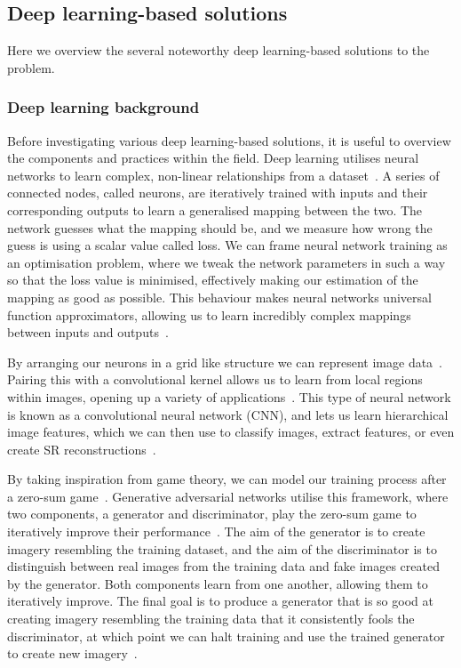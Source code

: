 \subsection{Deep learning-based solutions}
Here we overview the several noteworthy deep learning-based solutions to the problem.

\subsubsection{Deep learning background}
Before investigating various deep learning-based solutions, it is useful to overview the components and practices within the field. Deep learning utilises neural networks to learn complex, non-linear relationships from a dataset~\cite{nn}. A series of connected nodes, called neurons, are iteratively trained with inputs and their corresponding outputs to learn a generalised mapping between the two. The network guesses what the mapping should be, and we measure how wrong the guess is using a scalar value called loss. We can frame neural network training as an optimisation problem, where we tweak the network parameters in such a way so that the loss value is minimised, effectively making our estimation of the mapping as good as possible. This behaviour makes neural networks universal function approximators, allowing us to learn incredibly complex mappings between inputs and outputs~\cite{nn}.

By arranging our neurons in a grid like structure we can represent image data~\cite{imageNet}. Pairing this with a convolutional kernel allows us to learn from local regions within images, opening up a variety of applications~\cite{imageNet}. This type of neural network is known as a convolutional neural network (CNN), and lets us learn hierarchical image features, which we can then use to classify images, extract features, or even create SR reconstructions~\cite{vgg19,imageNet,srcnn}.

By taking inspiration from game theory, we can model our training process after a zero-sum game~\cite{gan}. Generative adversarial networks utilise this framework, where two components, a generator and discriminator, play the zero-sum game to iteratively improve their performance~\cite{gan}. The aim of the generator is to create imagery resembling the training dataset, and the aim of the discriminator is to distinguish between real images from the training data and fake images created by the generator. Both components learn from one another, allowing them to iteratively improve. The final goal is to produce a generator that is so good at creating imagery resembling the training data that it consistently fools the discriminator, at which point we can halt training and use the trained generator to create new imagery~\cite{gan}.

